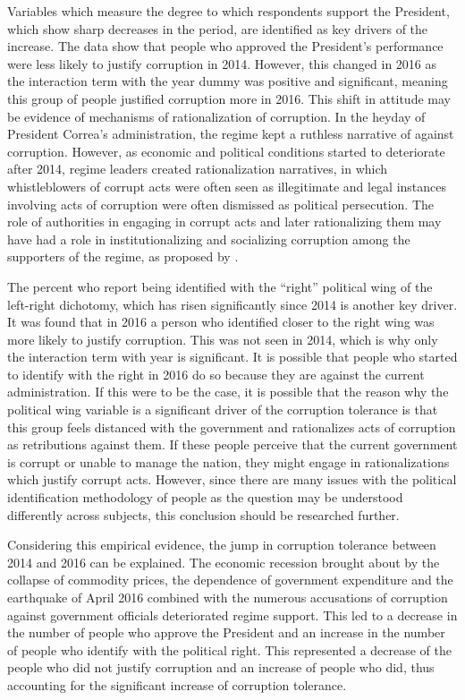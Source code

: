 \documentclass[12pt,a4]{article}\usepackage[]{graphicx}\usepackage[]{xcolor}
\begin{document}
Variables which measure the degree to which respondents support the President, which show sharp decreases in the period, are identified as key drivers of the increase. The data show that people who approved the President's performance were less likely to justify corruption in 2014. However, this changed in 2016 as the interaction term with the year dummy was positive and significant, meaning this group of people justified corruption more in 2016. This shift in attitude may be evidence of mechanisms of rationalization of corruption. In the heyday of President Correa's administration, the regime kept a ruthless narrative of against corruption. However, as economic and political conditions started to deteriorate after 2014, regime leaders created rationalization narratives, in which whistleblowers of corrupt acts were often seen as illegitimate and legal instances involving acts of corruption were often dismissed as political persecution. The role of authorities in engaging in corrupt acts and later rationalizing them may have had a role in institutionalizing and socializing corruption among the supporters of the regime, as proposed by \textcite{Ashforth.2003}. 

The percent who report being identified with the \enquote{right} political wing of the left-right dichotomy, which has risen significantly since 2014 is another key driver. It was found that in 2016 a person who identified closer to the right wing was more likely to justify corruption. This was not seen in 2014, which is why only the interaction term with year is significant. It is possible that people who started to identify with the right in 2016 do so because they are against the current administration. If this were to be the case, it is possible that the reason why the political wing variable is a significant driver of the corruption tolerance is that this group feels distanced with the government and rationalizes acts of corruption as retributions against them. If these people perceive that the current government is corrupt or unable to manage the nation, they might engage in rationalizations which justify corrupt acts. However, since there are many issues with the political identification methodology of people as the question may be understood differently across subjects, this conclusion should be researched further.

Considering this empirical evidence, the jump in corruption tolerance between 2014 and 2016 can be explained. The economic recession brought about by the collapse of commodity prices, the dependence of government expenditure and the earthquake of April 2016 combined with the numerous accusations of corruption against government officials deteriorated regime support. This led to a decrease in the number of people who approve the President and an increase in the number of people who identify with the political right. This represented a decrease of the people who did not justify corruption and an increase of people who did, thus accounting for the significant increase of corruption tolerance.
\end{document}
